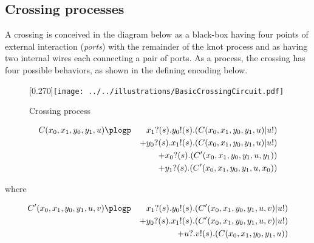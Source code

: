 \subsection{Crossing processes}\label{sub:crossing_processes} %
A crossing is conceived in the diagram below as a black-box having
four points of external interaction (\emph{ports}) with the remainder
of the knot process and as having two internal wires each connecting a
pair of ports. As a process, the crossing has four possible behaviors,
as shown in the defining encoding below.
\begin{figure}[hbp]
    \centering
    \scalebox{0.27}[0.270]{\texttt{[image: ../../illustrations/BasicCrossingCircuit.pdf]}}
    \caption{ Crossing process }
\end{figure}

\begin{eqnarray*}
   C(x_0,x_1,y_0,y_1,u) & \plogp   & x_1?(s).y_0!(s).(C(x_0,x_1,y_0,y_1,u)|u!) \nonumber \\
  & & + y_0?(s).x_1!(s).(C(x_0,x_1,y_0,y_1,u)|u!) \nonumber \\
  & & + x_0?(s).(C'(x_0,x_1,y_0,y_1,u,y_1)) \nonumber \\
  & & + y_1?(s).(C'(x_0,x_1,y_0,y_1,u,x_0)) \nonumber
\end{eqnarray*}

where

\begin{eqnarray*}
   C'(x_0,x_1,y_0,y_1,u,v) & \plogp   & x_1?(s).y_0!(s).(C'(x_0,x_1,y_0,y_1,u,v)|u!) \nonumber \\
  & & + y_0?(s).x_1!(s).(C'(x_0,x_1,y_0,y_1,u,v)|u!) \nonumber \\
  & & + u?.v!(s).(C(x_0, x_1, y_0, y_1, u)) \nonumber
\end{eqnarray*}

